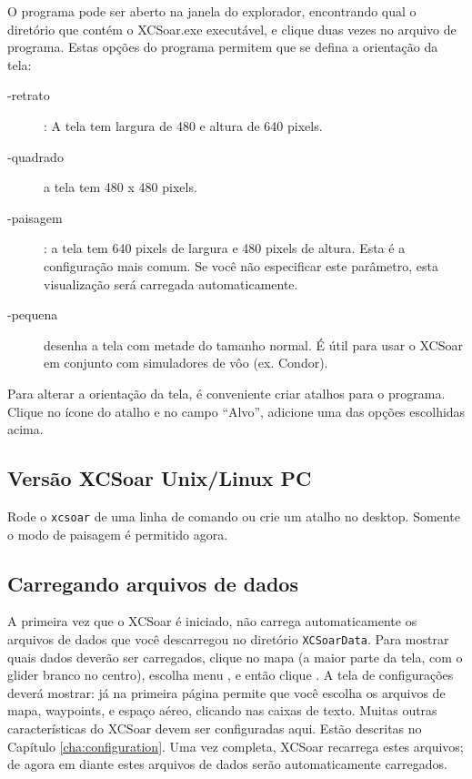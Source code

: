 O programa pode ser aberto na janela do explorador, encontrando qual o diretório que contém o XCSoar.exe executável, e clique duas vezes no arquivo de programa.
Estas opções do programa permitem que se defina a orientação da tela:

\begin{description}
\item[-retrato] :   A tela tem largura de 480 e altura de 640 pixels.
\item[-quadrado] a tela tem 480 x 480 pixels.
\item[-paisagem] :   a tela tem 640 pixels de largura e 480 pixels de altura.  Esta é a configuração mais comum.  Se você não especificar este parâmetro, esta visualização será carregada automaticamente.
\item[-pequena] desenha a tela com metade do tamanho normal.  É útil para usar o XCSoar em conjunto com simuladores de vôo (ex. Condor).
\end{description}
Para alterar a orientação da tela, é conveniente criar atalhos para o programa.  Clique no ícone do atalho e no campo “Alvo”, adicione uma das opções escolhidas acima.

\subsection*{Versão XCSoar Unix/Linux PC}
Rode o \verb|xcsoar| de uma linha de comando ou crie um atalho no desktop.  
Somente o modo de paisagem é permitido agora.


\subsection*{Carregando arquivos de dados}\label{sec:loaddatafiles}
A primeira vez que o XCSoar é iniciado, não carrega automaticamente os arquivos de dados que você descarregou no diretório \verb|XCSoarData|.  
Para mostrar quais dados deverão ser carregados, clique no mapa (a maior parte da tela, com o glider branco no centro), escolha menu , e então clique 
.  A tela de configurações deverá mostrar:
já na primeira página permite que você escolha os arquivos de mapa, waypoints, e espaço aéreo, clicando nas caixas de texto.  Muitas outras características do XCSoar devem ser configuradas aqui.  Estão descritas no Capítulo 
\ref{cha:configuration}.
Uma vez completa, XCSoar recarrega estes arquivos; de agora em diante estes arquivos de dados serão automaticamente carregados.

